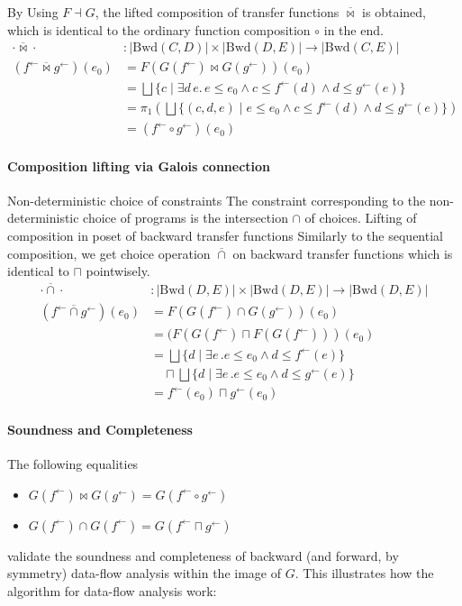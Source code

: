 \documentclass{llncs}
\newcommand{\Unidir}{\mathrm{Bwd}}
\newcommand{\fb}{{f^{\leftarrow}}}
\newcommand{\gb}{{g^{\leftarrow}}}
\newcommand{\bigjoin}{\bigsqcup}
\newcommand{\meet}{\sqcap}
\newcommand{\comp}{\circ}
\newcommand{\bowtielift}{\mathbin{\overline{\bowtie}}}
\newcommand{\caplift}{\mathbin{\overline{\cap}}}
\begin{document}
    By Using $F \dashv G$, the lifted composition of transfer functions $\bowtielift$ is obtained, which is identical to the ordinary function composition $\comp$ in the end.
    \begin{align*}
      \cdot \bowtielift \cdot &: \left| \Unidir(C, D) \right| \times  \left| \Unidir(D, E) \right| \to  \left| \Unidir(C, E) \right| \\
      (\fb \bowtielift \gb) (e_{0}) &= F(G(\fb) \bowtie G(\gb)) (e_{0}) \\
                                  &= \bigjoin \{ c \mid \exists d\, e.\,e \leq e_{0} \land c \leq \fb(d) \land d \leq \gb(e) \} \\
                                  &= \pi_{1} (\bigjoin \{ (c, d , e) \mid e \leq e_{0} \land c \leq \fb(d) \land d \leq \gb(e) \}) \\
                                  &= (\fb \comp \gb)(e_{0})
    \end{align*}

  \paragraph{Composition lifting via Galois connection}

  Non-deterministic choice of constraints
    The constraint corresponding to the non-deterministic choice of programs is the intersection $\cap$ of choices.
 Lifting of composition in poset of backward transfer functions
    Similarly to the sequential composition, we get choice operation $\caplift$ on backward transfer functions which is identical to $\meet$ pointwisely.
    \begin{align*}
      \cdot \caplift \cdot &: \left| \Unidir(D , E) \right| \times  \left| \Unidir(D, E) \right| \to \left| \Unidir(D, E) \right| \\
      (\fb \caplift \gb) (e_{0})
      &= F(G(\fb) \cap G(\gb)) (e_{0}) \\
      &= (F(G(\fb) \meet F(G(\fb))) (e_{0}) \\
      &= \bigjoin \{ d \mid \exists e\,. e \leq e_{0} \land d \leq \fb(e) \} \\ &\quad \meet \bigjoin \{ d \mid \exists e\,. e \leq e_{0} \land d \leq \gb(e) \} \\
      &= \fb(e_{0}) \meet \gb(e_{0})
    \end{align*}


  \paragraph{Soundness and Completeness}
  The following equalities
  \begin{itemize}
    \item $G(\fb) \bowtie G(\gb) = G(\fb \comp \gb)$
    \item $G(\fb) \cap G(\fb) = G(\fb \meet \gb)$
  \end{itemize}
  validate the soundness and completeness of backward (and forward, by symmetry) data-flow analysis within the image of $G$.  This illustrates how the algorithm for data-flow analysis work:
\end{document}
